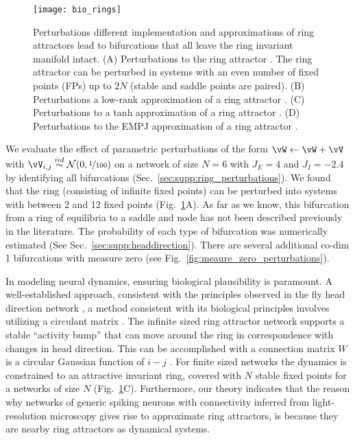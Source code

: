 \documentclass{article} %
\newcommand{\mpcomment}[1]{\textcolor{mpcolor}{(#1)}}
\newcounter{ct}
\newcommand{\iidsample}{\stackrel{iid}{\sim}}
\theoremstyle{definition}
\theoremstyle{remark}
\begin{document}
\begin{figure}[tbhp]
     \centering
  \texttt{[image: bio\_rings]}
       \caption{ Perturbations different implementation and approximations of ring attractors lead to bifurcations that all leave the ring invariant manifold intact.
       (A) Perturbations to the ring attractor \citep{Noorman2022}. The ring attractor can be perturbed in systems with an even number of fixed points (FPs) up to $2N$ (stable and saddle points are paired). 
       (B)  Perturbations a low-rank approximation of a ring attractor \citep{mastrogiuseppe2018}.
       (C)  Perturbations to a tanh approximation of a ring attractor \citep{seeholzer2017efficient}.
       (D)  Perturbations to the EMPJ approximation of a ring attractor \citep{pollock2020}.
       }
         \label{fig:bio_rings}
\end{figure}

We evaluate the effect of parametric perturbations of the form $ \vW \leftarrow \vW + \vV$ with $\vV_{i,j}\iidsample\mathcal{N}(0,\nicefrac{1}{100})$ on a network of size $N = 6$ with $J_E= 4$ and $J_I=-2.4$ by identifying all bifurcations (Sec.~\ref{sec:supp:ring_perturbations}).
We found that the ring (consisting of infinite fixed points) can be perturbed into systems with between 2 and 12 fixed points (Fig.~\ref{fig:bio_rings}A).
As far as we know, this bifurcation from a ring of equilibria to a saddle and node has not been described previously in the literature.
The probability of each type of bifurcation was numerically estimated (See Sec.~\ref{sec:supp:headdirection}).
There are several additional co-dim 1 bifurcations with measure zero (see Fig.~\ref{fig:meaure_zero_perturbations}).


In modeling neural dynamics, ensuring biological plausibility is paramount.
A well-established approach, consistent with the principles observed in the fly head direction network \citep{kakaria2017}, a method consistent with its biological principles involves utilizing a circulant matrix \citep{samsonovich1997path, seeholzer2017efficient, redish1996coupled, goodridge2000, compte2000synaptic}.
The infinite sized ring attractor network supports a stable “activity bump” that can move around the ring in correspondence with changes in head direction.
This can be accomplished with a connection matrix $W$ is a circular Gaussian function of $i-j$ \citep{seeholzer2017efficient,redish1996coupled,goodridge2000,compte2000synaptic}.
For finite sized networks the dynamics is constrained to an attractive invariant ring, covered with $N$ stable fixed points for a networks of size $N$ (Fig.~\ref{fig:bio_rings}C).
%
Furthermore, our theory indicates that the reason why networks of generic spiking neurons with connectivity inferred from light-resolution microscopy gives rise to approximate ring attractors\citep{kakaria2017}, is because they are nearby ring attractors as dynamical systems.
\end{document}
